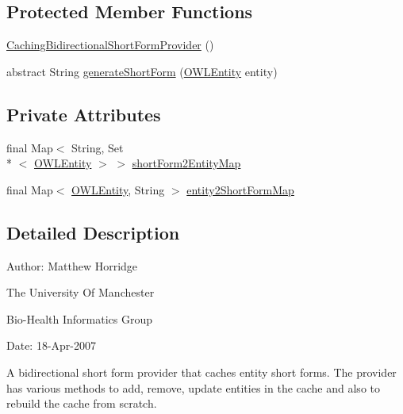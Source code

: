 \subsection*{Protected Member Functions}
\begin{DoxyCompactItemize}
\item 
\hyperlink{classorg_1_1semanticweb_1_1owlapi_1_1util_1_1_caching_bidirectional_short_form_provider_a8e056a0ae4407e2acee04f4c02f161e2}{Caching\-Bidirectional\-Short\-Form\-Provider} ()
\item 
abstract String \hyperlink{classorg_1_1semanticweb_1_1owlapi_1_1util_1_1_caching_bidirectional_short_form_provider_a9bdb7794f63a55fb88f752cacb362df4}{generate\-Short\-Form} (\hyperlink{interfaceorg_1_1semanticweb_1_1owlapi_1_1model_1_1_o_w_l_entity}{O\-W\-L\-Entity} entity)
\end{DoxyCompactItemize}
\subsection*{Private Attributes}
\begin{DoxyCompactItemize}
\item 
final Map$<$ String, Set\\*
$<$ \hyperlink{interfaceorg_1_1semanticweb_1_1owlapi_1_1model_1_1_o_w_l_entity}{O\-W\-L\-Entity} $>$ $>$ \hyperlink{classorg_1_1semanticweb_1_1owlapi_1_1util_1_1_caching_bidirectional_short_form_provider_a7f02f323f6713a39116db70eeb001ebe}{short\-Form2\-Entity\-Map}
\item 
final Map$<$ \hyperlink{interfaceorg_1_1semanticweb_1_1owlapi_1_1model_1_1_o_w_l_entity}{O\-W\-L\-Entity}, String $>$ \hyperlink{classorg_1_1semanticweb_1_1owlapi_1_1util_1_1_caching_bidirectional_short_form_provider_acea4d46e2b3f158403024c7aaed79349}{entity2\-Short\-Form\-Map}
\end{DoxyCompactItemize}


\subsection{Detailed Description}
Author\-: Matthew Horridge\par
 The University Of Manchester\par
 Bio-\/\-Health Informatics Group\par
 Date\-: 18-\/\-Apr-\/2007\par
 \par
 

A bidirectional short form provider that caches entity short forms. The provider has various methods to add, remove, update entities in the cache and also to rebuild the cache from scratch. 

